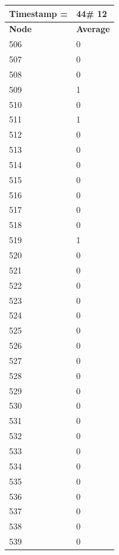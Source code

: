 \begin{tabular}{|l||l|}
\hline
\textbf{Timestamp =} & \textbf{44}\# 12\\\hline
	\textbf{Node} & \textbf{Average} \\ \hline
\hline
	506 & 0 \\ \hline
	507 & 0 \\ \hline
	508 & 0 \\ \hline
	509 & 1 \\ \hline
	510 & 0 \\ \hline
	511 & 1 \\ \hline
	512 & 0 \\ \hline
	513 & 0 \\ \hline
	514 & 0 \\ \hline
	515 & 0 \\ \hline
	516 & 0 \\ \hline
	517 & 0 \\ \hline
	518 & 0 \\ \hline
	519 & 1 \\ \hline
	520 & 0 \\ \hline
	521 & 0 \\ \hline
	522 & 0 \\ \hline
	523 & 0 \\ \hline
	524 & 0 \\ \hline
	525 & 0 \\ \hline
	526 & 0 \\ \hline
	527 & 0 \\ \hline
	528 & 0 \\ \hline
	529 & 0 \\ \hline
	530 & 0 \\ \hline
	531 & 0 \\ \hline
	532 & 0 \\ \hline
	533 & 0 \\ \hline
	534 & 0 \\ \hline
	535 & 0 \\ \hline
	536 & 0 \\ \hline
	537 & 0 \\ \hline
	538 & 0 \\ \hline
	539 & 0 \\ \hline
\end{tabular}

